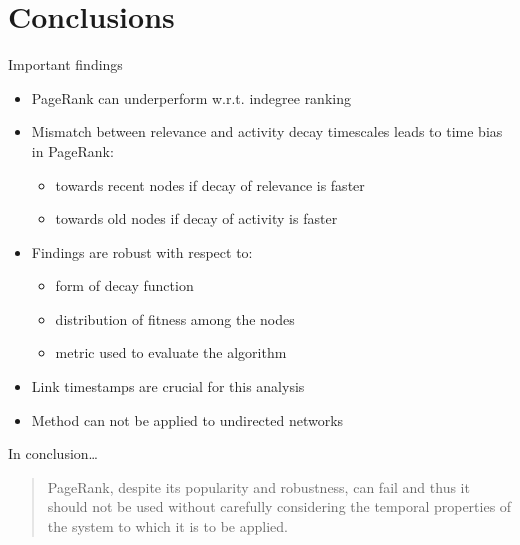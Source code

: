 \section{Conclusions}

\begin{frame}{Important findings}
    \begin{itemize}
        \item PageRank can underperform w.r.t. \alert{indegree ranking}
        \item Mismatch between relevance and activity decay timescales leads to \alert{time bias} in PageRank:
        \begin{itemize}
            \item towards recent nodes if decay of relevance is faster
            \item towards old nodes if decay of activity is faster
        \end{itemize}
        \item Findings are \alert{robust} with respect to:
        \begin{itemize}
            \item form of decay function
            \item distribution of fitness among the nodes
            \item metric used to evaluate the algorithm
        \end{itemize}
        \item Link \alert{timestamps} are crucial for this analysis
        \item Method can not be applied to undirected networks
    \end{itemize}

\end{frame}

\begin{frame}{In conclusion\ldots}
    \begin{quote}
        PageRank, despite its popularity and robustness, \alert{can fail} and thus it should not be used without \alert{carefully considering the temporal properties of the system} to which it is to be applied.
    \end{quote}
\end{frame}

